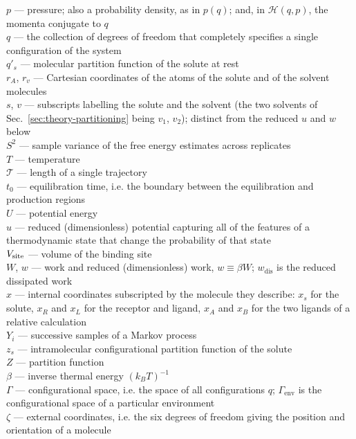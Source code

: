 \documentclass[9pt,bestpractices]{livecoms}
\begin{document}
\begin{tcolorbox}[title=List of Symbols, colback=green!10!white, breakable]
$p$ --- pressure; also a probability density, as in $p(q)$; and, in $\mathcal{H}(q,p)$, the momenta conjugate to $q$ \\
$q$ --- the collection of degrees of freedom that completely specifies a single configuration of the system\\
$q'_s$ --- molecular partition function of the solute at rest \\
$r_A$, $r_v$ --- Cartesian coordinates of the atoms of the solute and of the solvent molecules\\
$s$, $v$ --- subscripts labelling the solute and the solvent (the two solvents of Sec.~\ref{sec:theory-partitioning} being $v_1$, $v_2$); distinct from the reduced $u$ and $w$ below\\
$S^2$ --- sample variance of the free energy estimates across replicates\\
$T$ --- temperature \\
$\mathcal{T}$ --- length of a single trajectory\\
$t_0$ --- equilibration time, i.e. the boundary between the equilibration and production regions \\
$U$ --- potential energy\\
$u$ --- reduced (dimensionless) potential capturing all of the features of a thermodynamic state that change the probability of that state\\
$V_{\rm site}$ --- volume of the binding site\\
$W$, $w$ --- work and reduced (dimensionless) work, $w \equiv \beta W$; $w_{\mathrm{dis}}$ is the reduced dissipated work \\
$x$ --- internal coordinates subscripted by the molecule they describe: $x_s$ for the solute, $x_R$ and $x_L$ for the receptor and ligand, $x_A$ and $x_B$ for the two ligands of a relative calculation \\
$Y_i$ --- successive samples of a Markov process\\
$z_s$ --- intramolecular configurational partition function of the solute \\
$Z$ --- partition function \\
$\beta$ --- inverse thermal energy $(k_B T)^{-1}$ \\
$\Gamma$ --- configurational space, i.e. the space of all configurations $q$; $\Gamma_{\mathrm{env}}$ is the configurational space of a particular environment \\
$\zeta$ --- external coordinates, i.e. the six degrees of freedom giving the position and orientation of a molecule \\

\end{tcolorbox}
\end{document}
